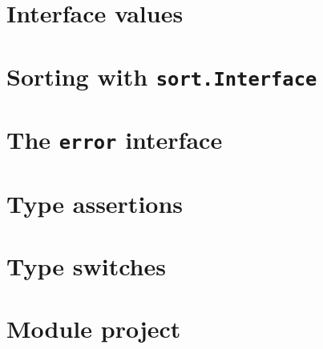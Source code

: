 \documentclass[]{book}
\begin{document}
\hypertarget{interface-values}{%
\section{Interface values}\label{interface-values}}

\hypertarget{sorting-with-sort.interface}{%
\section{\texorpdfstring{Sorting with \texttt{sort.Interface}}{Sorting with sort.Interface}}\label{sorting-with-sort.interface}}

\hypertarget{the-error-interface}{%
\section{\texorpdfstring{The \texttt{error} interface}{The error interface}}\label{the-error-interface}}

\hypertarget{type-assertions}{%
\section{Type assertions}\label{type-assertions}}

\hypertarget{type-switches}{%
\section{Type switches}\label{type-switches}}

\hypertarget{module-project-5}{%
\section*{Module project}\label{module-project-5}}
\end{document}
